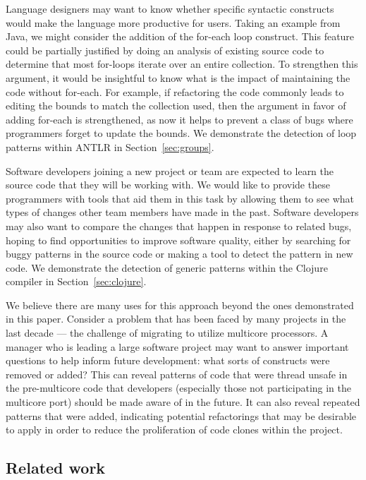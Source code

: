 Language designers may want to know whether specific syntactic constructs would
make the language more productive for users. Taking an example from Java, we
might consider the addition of the for-each loop construct. This feature could
be partially justified by doing an analysis of existing source code to
determine that most for-loops iterate over an entire collection. To strengthen
this argument, it would be insightful to know what is the impact of maintaining
the code without for-each. For example, if refactoring the code commonly leads
to editing the bounds to match the collection used, then the argument in favor
of adding for-each is strengthened, as now it helps to prevent a class of bugs
where programmers forget to update the bounds. We demonstrate the detection of
loop patterns within ANTLR in Section~\ref{sec:groups}.

Software developers joining a new project or team are expected to learn the
source code that they will be working with. We would like to provide these
programmers with tools that aid them in this task by allowing them to see what
types of changes other team members have made in the past. Software developers
may also want to compare the changes that happen in response to related bugs,
hoping to find opportunities to improve software quality, either by searching
for buggy patterns in the source code or making a tool to detect the pattern in
new code. We demonstrate the detection of generic patterns within the
Clojure compiler in Section~\ref{sec:clojure}.

We believe there are many uses for this approach beyond the ones demonstrated
in this paper. Consider a problem that has been faced by many projects in the
last decade --- the challenge of migrating to utilize multicore processors.  A
manager who is leading a large software project may want to answer important
questions to help inform future development: what sorts of constructs were
removed or added?  This can reveal patterns of code that were thread unsafe in
the pre-multicore code that developers (especially those not participating in
the multicore port) should be made aware of in the future.  It can also reveal
repeated patterns that were added, indicating potential refactorings that may
be desirable to apply in order to reduce the proliferation of code clones
within the project.


\subsection{Related work}

